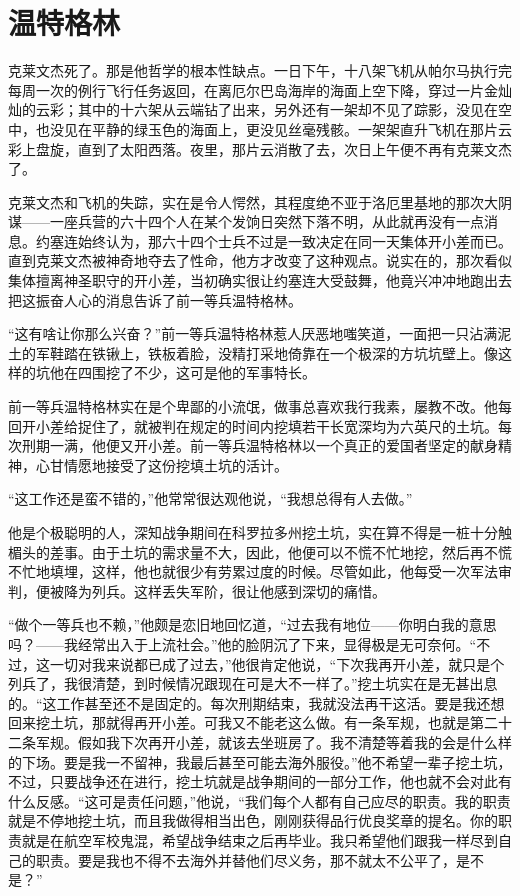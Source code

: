 \chapter{温特格林}
 
    克莱文杰死了。那是他哲学的根本性缺点。一日下午，十八架飞机从帕尔马执行完每周一次的例行飞行任务返回，在离厄尔巴岛海岸的海面上空下降，穿过一片金灿灿的云彩；其中的十六架从云端钻了出来，另外还有一架却不见了踪影，没见在空中，也没见在平静的绿玉色的海面上，更没见丝毫残骸。一架架直升飞机在那片云彩上盘旋，直到了太阳西落。夜里，那片云消散了去，次日上午便不再有克莱文杰了。

    克莱文杰和飞机的失踪，实在是令人愕然，其程度绝不亚于洛厄里基地的那次大阴谋——一座兵营的六十四个人在某个发饷日突然下落不明，从此就再没有一点消息。约塞连始终认为，那六十四个士兵不过是一致决定在同一天集体开小差而已。直到克莱文杰被神奇地夺去了性命，他方才改变了这种观点。说实在的，那次看似集体擅离神圣职守的开小差，当初确实很让约塞连大受鼓舞，他竟兴冲冲地跑出去把这振奋人心的消息告诉了前一等兵温特格林。

    “这有啥让你那么兴奋？”前一等兵温特格林惹人厌恶地嗤笑道，一面把一只沾满泥土的军鞋踏在铁锹上，铁板着脸，没精打采地倚靠在一个极深的方坑坑壁上。像这样的坑他在四围挖了不少，这可是他的军事特长。

    前一等兵温特格林实在是个卑鄙的小流氓，做事总喜欢我行我素，屡教不改。他每回开小差给捉住了，就被判在规定的时间内挖填若干长宽深均为六英尺的土坑。每次刑期一满，他便又开小差。前一等兵温特格林以一个真正的爱国者坚定的献身精神，心甘情愿地接受了这份挖填土坑的活计。

    “这工作还是蛮不错的，”他常常很达观他说，“我想总得有人去做。”

    他是个极聪明的人，深知战争期间在科罗拉多州挖土坑，实在算不得是一桩十分触楣头的差事。由于土坑的需求量不大，因此，他便可以不慌不忙地挖，然后再不慌不忙地填埋，这样，他也就很少有劳累过度的时候。尽管如此，他每受一次军法审判，便被降为列兵。这样丢失军阶，很让他感到深切的痛惜。

    “做个一等兵也不赖，”他颇是恋旧地回忆道，“过去我有地位——你明白我的意思吗？——我经常出入于上流社会。”他的脸阴沉了下来，显得极是无可奈何。“不过，这一切对我来说都已成了过去，”他很肯定他说，“下次我再开小差，就只是个列兵了，我很清楚，到时候情况跟现在可是大不一样了。”挖土坑实在是无甚出息的。“这工作甚至还不是固定的。每次刑期结束，我就没法再干这活。要是我还想回来挖土坑，那就得再开小差。可我又不能老这么做。有一条军规，也就是第二十二条军规。假如我下次再开小差，就该去坐班房了。我不清楚等着我的会是什么样的下场。要是我一不留神，我最后甚至可能去海外服役。”他不希望一辈子挖土坑，不过，只要战争还在进行，挖土坑就是战争期间的一部分工作，他也就不会对此有什么反感。“这可是责任问题，”他说，“我们每个人都有自己应尽的职责。我的职责就是不停地挖土坑，而且我做得相当出色，刚刚获得品行优良奖章的提名。你的职责就是在航空军校鬼混，希望战争结束之后再毕业。我只希望他们跟我一样尽到自己的职责。要是我也不得不去海外并替他们尽义务，那不就太不公平了，是不是？”

